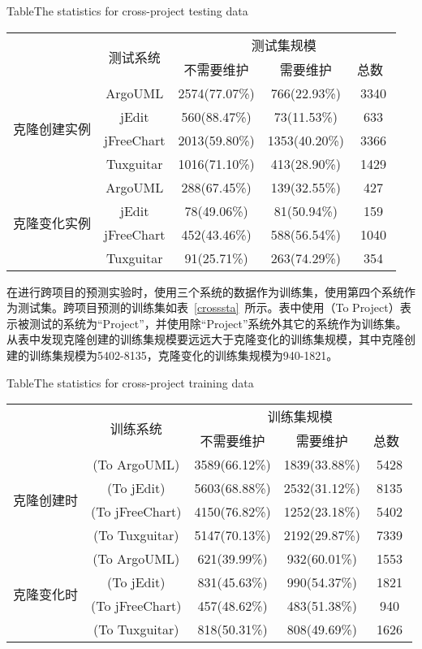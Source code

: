 \begin{table}[htbp]
{Table$\!$}{The statistics for cross-project testing data}
\vspace{0.5em}
\centering
\wuhao
\begin{tabular}{ccccc}
\toprule[1.5pt]
~\multirow{2}{*}{类型}&\multirow{2}{*}{测试系统}&\multicolumn{3}{c}{测试集规模}\\
\cline{3-5}
~&~&{不需要维护}&{需要维护}&{总数}~\\
\midrule[1pt]
\multirow{4}{*}{克隆创建实例}
&ArgoUML&	2574(77.07\%)&	766(22.93\%)&	3340\\
&jEdit&560(88.47\%)&	73(11.53\%)&	633\\
&jFreeChart&	2013(59.80\%)&	1353(40.20\%)&	3366\\
&Tuxguitar&	1016(71.10\%)&	413(28.90\%)&	1429\\
\hline
\multirow{4}{*}{克隆变化实例}
&ArgoUML&288(67.45\%)&139(32.55\%)&427\\
&jEdit&78(49.06\%)&81(50.94\%)&159\\
&jFreeChart&452(43.46\%)&588(56.54\%)&1040\\
&Tuxguitar&91(25.71\%)&263(74.29\%)&354\\
\bottomrule[1.5pt]
\end{tabular}
\end{table}

在进行跨项目的预测实验时，使用三个系统的数据作为训练集，使用第四个系统作为测试集。跨项目预测的训练集如表~\ref{crosssta}~所示。表中使用（To Project）表示被测试的系统为“Project”，并使用除“Project”系统外其它的系统作为训练集。从表中发现克隆创建的训练集规模要远远大于克隆变化的训练集规模，其中克隆创建的训练集规模为5402-8135，克隆变化的训练集规模为940-1821。

\begin{table}[htbp]
{Table$\!$}{The statistics for cross-project training data}
\vspace{0.5em}
\centering
\wuhao
\begin{tabular}{ccccc}
\toprule[1.5pt]
~\multirow{2}{*}{类型}&\multirow{2}{*}{训练系统}&\multicolumn{3}{c}{训练集规模}\\
\cline{3-5}
~&~&{不需要维护}&{需要维护}&{总数}~\\
\midrule[1pt]
\multirow{4}{*}{克隆创建时}
&(To ArgoUML)&3589(66.12\%)&1839(33.88\%)&5428\\
&(To jEdit)&5603(68.88\%)&2532(31.12\%)&8135\\
&(To jFreeChart)&4150(76.82\%)&1252(23.18\%)&5402\\
&(To Tuxguitar)&	5147(70.13\%)&2192(29.87\%)&	7339\\
\hline
\multirow{4}{*}{克隆变化时}
&(To ArgoUML)&621(39.99\%)&932(60.01\%)&1553\\
&(To jEdit)&831(45.63\%)&990(54.37\%)&1821\\
&(To jFreeChart)&457(48.62\%)&483(51.38\%)&940\\
&(To Tuxguitar)&	818(50.31\%)&808(49.69\%)&1626\\
\bottomrule[1.5pt]
\end{tabular}
\end{table}

